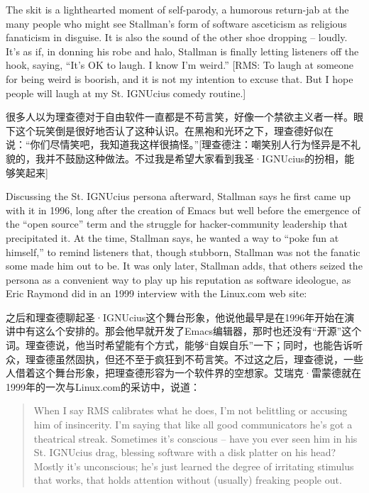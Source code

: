 \ifdefined\eng
The skit is a lighthearted moment of self-parody, a humorous return-jab at the many people who might see Stallman's form of software asceticism as religious fanaticism in disguise. It is also the sound of the other shoe dropping -- loudly. It's as if, in donning his robe and halo, Stallman is finally letting listeners off the hook, saying, ``It's OK to laugh. I know I'm weird.''  [RMS: To laugh at someone for being weird is boorish, and it is not my intention to excuse that.  But I hope people will laugh at my St. IGNUcius comedy routine.]
\fi

\ifdefined\chs
很多人以为理查德对于自由软件一直都是不苟言笑，好像一个禁欲主义者一样。眼下这个玩笑倒是很好地否认了这种认识。在黑袍和光环之下，理查德好似在说：``你们尽情笑吧，我知道我这样很搞怪。''[理查德注：嘲笑别人行为怪异是不礼貌的，我并不鼓励这种做法。不过我是希望大家看到我圣·IGNUcius的扮相，能够笑起来]
\fi

\ifdefined\eng
Discussing the St. IGNUcius persona afterward, Stallman says he first came up with it in 1996, long after the creation of Emacs but well before the emergence of the ``open source'' term and the struggle for hacker-community leadership that precipitated it. At the time, Stallman says, he wanted a way to ``poke fun at himself,'' to remind listeners that, though stubborn, Stallman was not the fanatic some made him out to be. It was only later, Stallman adds, that others seized the persona as a convenient way to play up his reputation as software ideologue, as Eric Raymond did in an 1999 interview with the Linux.com web site:
\fi

\ifdefined\chs
之后和理查德聊起圣·IGNUcius这个舞台形象，他说他最早是在1996年开始在演讲中有这么个安排的。那会他早就开发了Emacs编辑器，那时也还没有``开源''这个词。理查德说，他当时希望能有个方式，能够``自娱自乐''一下；同时，也能告诉听众，理查德虽然固执，但还不至于疯狂到不苟言笑。不过这之后，理查德说，一些人借着这个舞台形象，把理查德形容为一个软件界的空想家。艾瑞克·雷蒙德就在1999年的一次与Linux.com的采访中，说道：
\fi

\ifdefined\eng
\begin{quote}
When I say RMS calibrates what he does, I'm not belittling or accusing him of insincerity. I'm saying that like all good communicators he's got a theatrical streak. Sometimes it's conscious -- have you ever seen him in his St. IGNUcius drag, blessing software with a disk platter on his head? Mostly it's unconscious; he's just learned the degree of irritating stimulus that works, that holds attention without (usually) freaking people out.
\end{quote}
\fi

